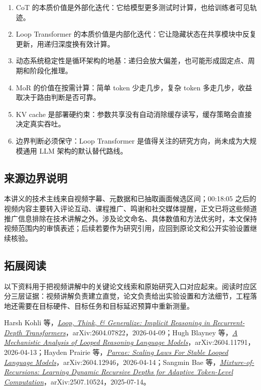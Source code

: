 ﻿\documentclass[a4paper]{article}
\begin{document}
\begin{enumerate}
  \item CoT 的本质价值是外部化迭代：它给模型更多测试时计算，也给训练者可见轨迹。
  \item Loop Transformer 的本质价值是内部化迭代：它让隐藏状态在共享模块中反复更新，用递归深度换有效计算。
  \item 动态系统稳定性是循环架构的地基：递归会放大偏差，也可能形成固定点、周期和阶段化推理。
  \item MoR 的价值在按需计算：简单 token 少走几步，复杂 token 多走几步，收益取决于路由判断是否可靠。
  \item KV cache 是部署硬约束：参数共享没有自动消除缓存读写，缓存策略会直接决定真实吞吐。
  \item 边界判断必须保守：Loop Transformer 是值得关注的研究方向，尚未成为大规模通用 LLM 架构的默认替代路线。
\end{enumerate}

\subsection{来源边界说明}

本讲义的技术主线来自视频字幕、元数据和已抽取画面候选区间；00:18:05 之后的视频内容主要转入评论互动、课程推广、鸣谢和社交媒体提醒，正文已将这些频道推广信息排除在技术讲解之外。涉及论文命名、具体数值和方法优劣时，本文保持视频范围内的审慎表述；后续若要作为研究引用，应回到原论文和公开实验设置继续核验。

\subsection{拓展阅读}

以下资料用于把视频讲解中的关键论文线索和原始研究入口对应起来。阅读时应区分三层证据：视频讲解负责建立直觉，论文负责给出实验设置和方法细节，工程落地还需要在目标硬件、目标任务和目标延迟预算中重新测量。

\begingroup
\small
Harsh Kohli 等，\href{https://arxiv.org/abs/2604.07822}{\emph{Loop, Think, \& Generalize: Implicit Reasoning in Recurrent-Depth Transformers}}，arXiv:2604.07822，2026-04-09；Hugh Blayney 等，\href{https://arxiv.org/abs/2604.11791}{\emph{A Mechanistic Analysis of Looped Reasoning Language Models}}，arXiv:2604.11791，2026-04-13；Hayden Prairie 等，\href{https://arxiv.org/abs/2604.12946}{\emph{Parcae: Scaling Laws For Stable Looped Language Models}}，arXiv:2604.12946，2026-04-14；Sangmin Bae 等，\href{https://arxiv.org/abs/2507.10524}{\emph{Mixture-of-Recursions: Learning Dynamic Recursive Depths for Adaptive Token-Level Computation}}，arXiv:2507.10524，2025-07-14。
\par
\endgroup
\end{document}
